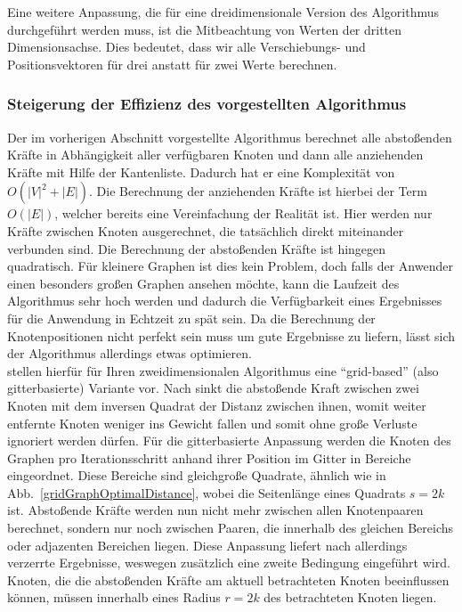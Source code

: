 \documentclass[12pt, a4paper]{article}
\begin{document}
Eine weitere Anpassung, die für eine dreidimensionale Version des Algorithmus durchgeführt werden muss, ist die Mitbeachtung von Werten der dritten Dimensionsachse. Dies bedeutet, dass wir alle Verschiebungs- und Positionsvektoren für drei anstatt für zwei Werte berechnen.\\

\subsubsection{Steigerung der Effizienz des vorgestellten Algorithmus}
Der im vorherigen Abschnitt vorgestellte Algorithmus berechnet alle abstoßenden Kräfte in Abhängigkeit aller verfügbaren Knoten und dann alle anziehenden Kräfte mit Hilfe der Kantenliste. Dadurch hat er eine Komplexität von $O(|V|^2 + |E|)$. Die Berechnung der anziehenden Kräfte ist hierbei der Term $O(|E|)$, welcher bereits eine Vereinfachung der Realität ist. Hier werden nur Kräfte zwischen Knoten ausgerechnet, die tatsächlich direkt miteinander verbunden sind. Die Berechnung der abstoßenden Kräfte ist hingegen quadratisch. Für kleinere Graphen ist dies kein Problem, doch falls der Anwender einen besonders großen Graphen ansehen möchte, kann die Laufzeit des Algorithmus sehr hoch werden und dadurch die Verfügbarkeit eines Ergebnisses für die Anwendung in Echtzeit zu spät sein.  Da die Berechnung der Knotenpositionen nicht perfekt sein muss um gute Ergebnisse zu liefern, lässt sich der Algorithmus allerdings etwas optimieren.\\

 stellen hierfür für Ihren zweidimensionalen Algorithmus eine "`grid-based"' (also gitterbasierte) Variante vor. Nach  sinkt die abstoßende Kraft zwischen zwei Knoten mit dem inversen Quadrat der Distanz zwischen ihnen, womit weiter entfernte Knoten weniger ins Gewicht fallen und somit ohne große Verluste ignoriert werden dürfen. Für die gitterbasierte Anpassung werden die Knoten des Graphen pro Iterationsschritt anhand ihrer Position im Gitter in Bereiche eingeordnet. Diese Bereiche sind gleichgroße Quadrate, ähnlich wie in Abb.~\ref{gridGraphOptimalDistance}, wobei die Seitenlänge eines Quadrats $s=2k$ ist. Abstoßende Kräfte werden nun nicht mehr zwischen allen Knotenpaaren berechnet, sondern nur noch zwischen Paaren, die innerhalb des gleichen Bereichs oder adjazenten Bereichen liegen. Diese Anpassung liefert nach  allerdings verzerrte Ergebnisse, weswegen zusätzlich eine zweite Bedingung eingeführt wird. Knoten, die die abstoßenden Kräfte am aktuell betrachteten Knoten beeinflussen können, müssen innerhalb eines Radius $r=2k$ des betrachteten Knoten liegen.\\
\end{document}
